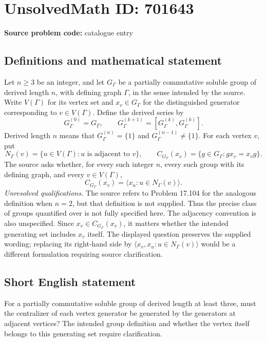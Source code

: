 \documentclass[11pt]{article}
\begin{document}
\section*{UnsolvedMath ID: 701643}
\textbf{Source problem code:} catalogue entry
\subsection{Definitions and mathematical statement}
Let \(n\geq 3\) be an integer, and let \(G_\Gamma\) be a partially commutative soluble group of derived length \(n\), with defining graph \(\Gamma\), in the sense intended by the source. Write \(V(\Gamma)\) for its vertex set and \(x_v\in G_\Gamma\) for the distinguished generator corresponding to \(v\in V(\Gamma)\). Define the derived series by
\[
G_\Gamma^{(0)}=G_\Gamma,\qquad G_\Gamma^{(k+1)}=[G_\Gamma^{(k)},G_\Gamma^{(k)}].
\]
Derived length \(n\) means that \(G_\Gamma^{(n)}=\{1\}\) and \(G_\Gamma^{(n-1)}\neq\{1\}\). For each vertex \(v\), put
\[
N_\Gamma(v)=\{u\in V(\Gamma):u\text{ is adjacent to }v\},\qquad
C_{G_\Gamma}(x_v)=\{g\in G_\Gamma:gx_v=x_vg\}.
\]
The source asks whether, for every such integer \(n\), every such group with its defining graph, and every \(v\in V(\Gamma)\),
\[
C_{G_\Gamma}(x_v)=\bigl\langle x_u:u\in N_\Gamma(v)\bigr\rangle.
\]
\emph{Unresolved qualifications.} The source refers to Problem 17.104 for the analogous definition when \(n=2\), but that definition is not supplied. Thus the precise class of groups quantified over is not fully specified here. The adjacency convention is also unspecified. Since \(x_v\in C_{G_\Gamma}(x_v)\), it matters whether the intended generating set includes \(x_v\) itself. The displayed question preserves the supplied wording; replacing its right-hand side by \(\langle x_v,x_u:u\in N_\Gamma(v)\rangle\) would be a different formulation requiring source clarification.
\subsection{Short English statement}
For a partially commutative soluble group of derived length at least three, must the centralizer of each vertex generator be generated by the generators at adjacent vertices? The intended group definition and whether the vertex itself belongs to this generating set require clarification.
\end{document}
